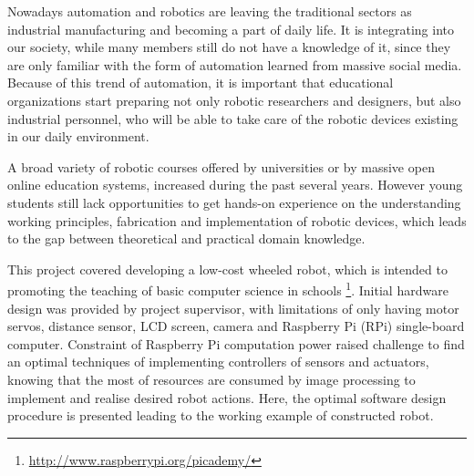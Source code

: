Nowadays automation and robotics are leaving the traditional sectors as industrial manufacturing and becoming a part of daily life. It is integrating into our society, while many members still do not have a knowledge of it, since they are only familiar with the form of automation learned from massive social media.
Because of this trend of automation, it is important that educational organizations start preparing not only robotic researchers and designers, but also industrial personnel, who will be able
to take care of the robotic devices existing in our daily environment. 

A broad variety of robotic courses offered by universities or by massive open online education systems, increased during the past several years. However young students still lack opportunities to get hands-on experience on the understanding working principles, fabrication and implementation of robotic devices, which leads to the gap between theoretical and practical domain knowledge.

This project covered developing a low-cost wheeled robot, which is intended to promoting the teaching of basic computer science in schools \footnote{\url{http://www.raspberrypi.org/picademy/}}. Initial hardware design was provided by project supervisor, with limitations of only having motor servos, distance sensor, LCD screen, camera and Raspberry Pi (RPi) single-board computer.
Constraint of  Raspberry Pi computation power raised challenge to find an  optimal techniques of implementing controllers of sensors and actuators, knowing that the most of resources are consumed by image processing to implement and realise desired robot actions. Here, the optimal software design procedure is presented leading to the working example of constructed robot.
